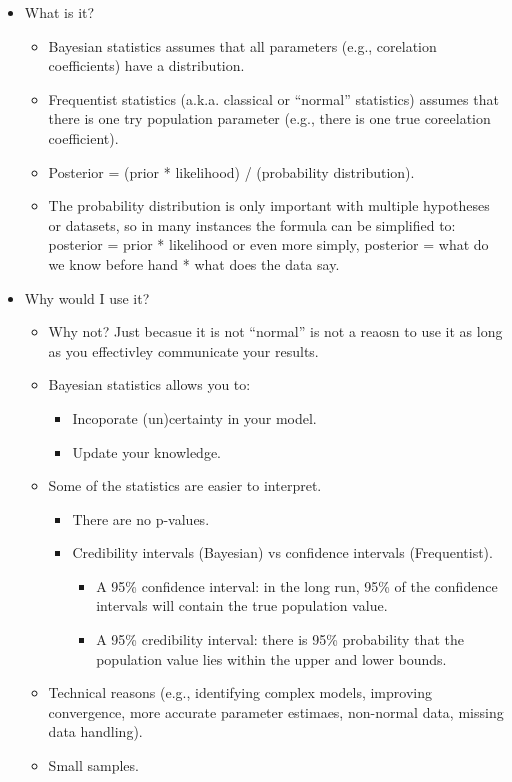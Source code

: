 \documentclass[]{book}
\providecommand{\tightlist}{%
  \setlength{\itemsep}{0pt}\setlength{\parskip}{0pt}}
\begin{document}
\begin{itemize}
\tightlist
\item
  What is it?

  \begin{itemize}
  \tightlist
  \item
    Bayesian statistics assumes that all parameters (e.g., corelation coefficients) have a distribution.
  \item
    Frequentist statistics (a.k.a. classical or ``normal'' statistics) assumes that there is one try population parameter (e.g., there is one true coreelation coefficient).
  \item
    Posterior = (prior * likelihood) / (probability distribution).
  \item
    The probability distribution is only important with multiple hypotheses or datasets, so in many instances the formula can be simplified to: posterior = prior * likelihood or even more simply, posterior = what do we know before hand * what does the data say.
  \end{itemize}
\item
  Why would I use it?

  \begin{itemize}
  \tightlist
  \item
    Why not? Just becasue it is not ``normal'' is not a reaosn to use it as long as you effectivley communicate your results.
  \item
    Bayesian statistics allows you to:

    \begin{itemize}
    \tightlist
    \item
      Incoporate (un)certainty in your model.
    \item
      Update your knowledge.
    \end{itemize}
  \item
    Some of the statistics are easier to interpret.

    \begin{itemize}
    \tightlist
    \item
      There are no p-values.
    \item
      Credibility intervals (Bayesian) vs confidence intervals (Frequentist).

      \begin{itemize}
      \tightlist
      \item
        A 95\% confidence interval: in the long run, 95\% of the confidence intervals will contain the true population value.
      \item
        A 95\% credibility interval: there is 95\% probability that the population value lies within the upper and lower bounds.
      \end{itemize}
    \end{itemize}
  \item
    Technical reasons (e.g., identifying complex models, improving convergence, more accurate parameter estimaes, non-normal data, missing data handling).
  \item
    Small samples.


\end{itemize}
\end{itemize}
\end{document}
